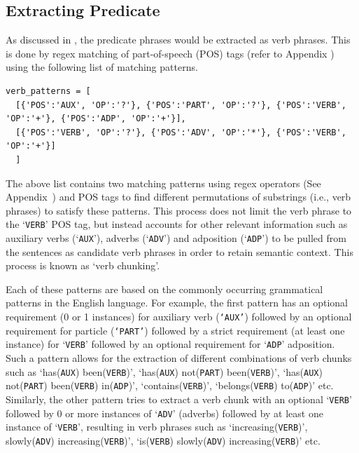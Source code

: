 \subsection{Extracting Predicate}

As discussed in , the predicate phrases would be extracted as verb phrases. This is done by regex matching of part-of-speech (POS) tags (refer to Appendix ) using the following list of matching patterns. 

\begin{verbatim}
verb_patterns = [
  [{'POS':'AUX', 'OP':'?'}, {'POS':'PART', 'OP':'?'}, {'POS':'VERB', 'OP':'+'}, {'POS':'ADP', 'OP':'+'}],
  [{'POS':'VERB', 'OP':'?'}, {'POS':'ADV', 'OP':'*'}, {'POS':'VERB', 'OP':'+'}]
  ]
\end{verbatim}

The above list contains two matching patterns using regex operators (See Appendix~) and POS tags to find different permutations of substrings (i.e., verb phrases) to satisfy these patterns. This process does not limit the verb phrase to the `\texttt{VERB}' POS tag, but instead accounts for other relevant information such as auxiliary verbs (`\texttt{AUX}'), adverbs (`\texttt{ADV}') and adposition (`\texttt{ADP}') to be pulled from the sentences as candidate verb phrases in order to retain semantic context. This process is known as `verb chunking'. 

Each of these patterns are based on the commonly occurring grammatical patterns in the English language. For example, the first pattern has an optional requirement (0 or 1 instances) for auxiliary verb (\texttt{`AUX'}) followed by an optional requirement for particle (\texttt{`PART'}) followed by a strict requirement (at least one instance) for `\texttt{VERB}' followed by an optional requirement for `\texttt{ADP}' adposition. Such a pattern allows for the extraction of different combinations of verb chunks such as `has(\texttt{AUX}) been(\texttt{VERB})', `has(\texttt{AUX}) not(\texttt{PART}) been(\texttt{VERB})', `has(\texttt{AUX}) not(\texttt{PART}) been(\texttt{VERB}) in(\texttt{ADP})', `contains(\texttt{VERB})', `belongs(\texttt{VERB}) to(\texttt{ADP})' etc. Similarly, the other pattern tries to extract a verb chunk with an optional `\texttt{VERB}' followed by 0 or more instances of `\texttt{ADV}' (adverbs) followed by at least one instance of `\texttt{VERB}', resulting in verb phrases such as `increasing(\texttt{VERB})', slowly(\texttt{ADV}) increasing(\texttt{VERB})', `is(\texttt{VERB}) slowly(\texttt{ADV}) increasing(\texttt{VERB})' etc. 

